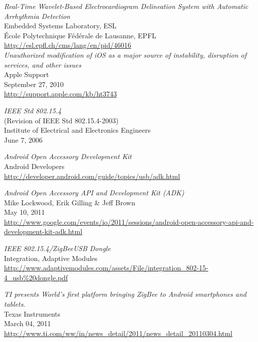 \begin{thebibliography}{widest-label}

 	\emph{Real-Time Wavelet-Based Electrocardiogram Delineation System with Automatic Arrhythmia Detection}\\
 	Embedded Systems Laboratory, ESL\\
 	École Polytechnique Fédérale de Lausanne, EPFL\\
 	\url{http://esl.epfl.ch/cms/lang/en/pid/46016}\\
	
	\emph{Unauthorized modification of iOS as a major source of instability, disruption of services, and other issues}\\
	Apple Support\\
	September 27, 2010\\
	\url{http://support.apple.com/kb/ht3743}
	
	\emph{IEEE Std 802.15.4}\\
	(Revision of IEEE Std 802.15.4-2003)\\
	Institute of Electrical and Electronics Engineers\\
	June 7, 2006
	
	\emph{Android Open Accessory Development Kit}\\
	Android Developers\\
	\url{http://developer.android.com/guide/topics/usb/adk.html}
	
	\emph{Android Open Accessory API and Development Kit (ADK)}\\
	Mike Lockwood, Erik Gilling \& Jeff Brown\\
	May 10, 2011\\
	\url{http://www.google.com/events/io/2011/sessions/android-open-accessory-api-and-development-kit-adk.html}
	
	\emph{IEEE 802.15.4/ZigBee\texttrademark USB Dongle}\\
	Integration, Adaptive Modules\\
	\url{http://www.adaptivemodules.com/assets/File/integration_802-15-4_usb\%20dongle.pdf}	

	\emph{TI presents World’s first platform bringing ZigBee to Android smartphones and tablets}.\\
 	Texas Instruments\\
	March 04, 2011\\
 	\url{http://www.ti.com/ww/in/news_detail/2011/news_detail_20110304.html}\\
 	

\end{thebibliography}
